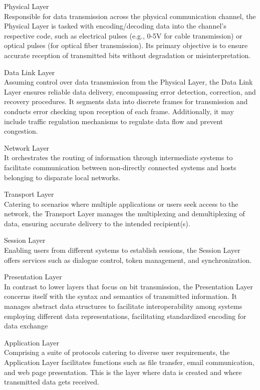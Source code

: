 \begin{outline}
\1 Physical Layer\\
Responsible for data transmission across the physical communication channel, the Physical Layer is tasked with encoding/decoding data into the channel's respective code, such as electrical pulses (e.g., 0-5V for cable transmission) or optical pulses (for optical fiber transmission). Its primary objective is to ensure accurate reception of transmitted bits without degradation or misinterpretation.

\1 Data Link Layer\\
Assuming control over data transmission from the Physical Layer, the Data Link Layer ensures reliable data delivery, encompassing error detection, correction, and recovery procedures. It segments data into discrete frames for transmission and conducts error checking upon reception of each frame. Additionally, it may include traffic regulation mechanisms to regulate data flow and prevent congestion.

\1 Network Layer\\
It orchestrates the routing of information through intermediate systems to facilitate communication between non-directly connected systems and hosts belonging to disparate local networks.

\1 Transport Layer\\
Catering to scenarios where multiple applications or users seek access to the network, the Transport Layer manages the multiplexing and demultiplexing of data, ensuring accurate delivery to the intended recipient(s).

\1 Session Layer\\
Enabling users from different systems to establish sessions, the Session Layer offers services such as dialogue control, token management, and synchronization.

\1 Presentation Layer\\
In contrast to lower layers that focus on bit transmission, the Presentation Layer concerns itself with the syntax and semantics of transmitted information. It manages abstract data structures to facilitate interoperability among systems employing different data representations, facilitating standardized encoding for data exchange

\1 Application Layer\\
Comprising a suite of protocols catering to diverse user requirements, the Application Layer facilitates functions such as file transfer, email communication, and web page presentation. This is the layer where data is created and where transmitted data gets received.
\end{outline}\\


